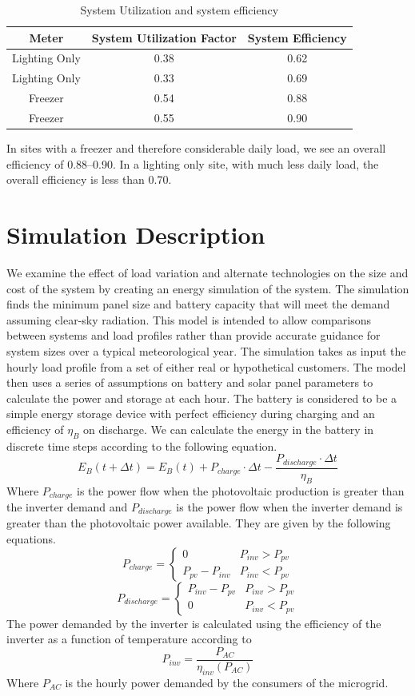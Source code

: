 \documentclass[conference]{IEEEtran}
\newcommand{\ppv}{P_{pv}}
\newcommand{\pinv}{P_{inv}}
\begin{document}
\begin{table}
\centering
\begin{tabular}{c c c}
Meter & System Utilization Factor & System Efficiency \\
\hline
Lighting Only & 0.38 & 0.62 \\
Lighting Only & 0.33 & 0.69 \\
Freezer & 0.54 & 0.88 \\
Freezer & 0.55 & 0.90 \\
\end{tabular}
\caption{System Utilization and system efficiency}
\label{efficiency}
\end{table}

In sites with a freezer and therefore considerable daily load, 
we see an overall efficiency of 0.88--0.90.
In a lighting only site, with much less daily load, the overall efficiency
is less than 0.70.

\section{Simulation Description}

We examine the effect of load variation and alternate technologies
on the size and cost of the system by creating an 
energy simulation of the system.
The simulation finds the minimum panel size and battery capacity
that will meet the demand assuming clear-sky radiation.
This model is intended to allow comparisons between systems and
load profiles rather than provide accurate guidance for system
sizes over a typical meteorological year.
The simulation takes as input the hourly load profile from a
set of either real or hypothetical customers.
The model then uses a series of assumptions on battery and solar
panel parameters to calculate the power and storage at each hour.
The battery is considered to be a simple energy storage device
with perfect efficiency during charging and an efficiency of
$\eta_B$ on discharge.
We can calculate the energy in the battery in discrete time
steps according to the following equation.
%
$$ E_B(t+\Delta t) = E_B(t)
                   + P_{charge} \cdot \Delta t
                   - \frac{P_{discharge} \cdot \Delta t}{\eta_B}
                   $$
%
Where $P_{charge}$ is the power flow when the photovoltaic
production is greater than the inverter demand and
$P_{discharge}$ is the power flow when the inverter demand
is greater than the photovoltaic power available.
They are given by the following equations.
%
$$ P_{charge} = \left\{
			  \begin{array}{rl}
			  0 & \pinv > \ppv \\
			  \ppv - \pinv & \pinv < \ppv
			  \end{array}
			  \right. $$
%
$$ P_{discharge} = \left\{
			  \begin{array}{rl}
			  \pinv - \ppv & \pinv > \ppv \\
			  0 & \pinv < \ppv
			  \end{array}
			  \right. $$
%
The power demanded by the inverter is calculated using the efficiency
of the inverter as a function of temperature according to
$$ \pinv = \frac{P_{AC}}{\eta_{inv}(P_{AC})} $$
%
Where $P_{AC}$ is the hourly power demanded by the consumers of the microgrid.
\end{document}
